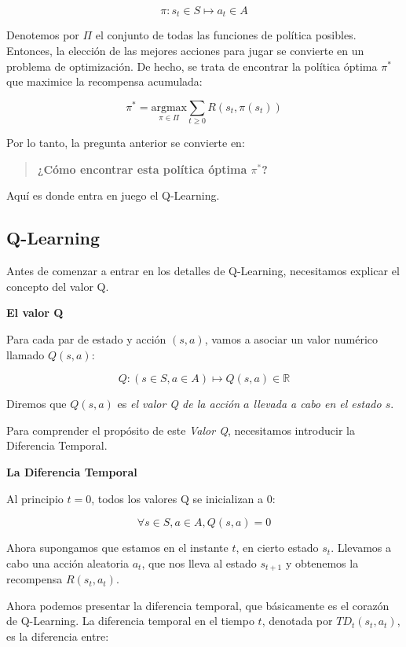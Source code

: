 \documentclass[
]{book}
\begin{document}
\[\pi: s_t \in S \mapsto a_t \in A\]

Denotemos por \(\Pi\) el conjunto de todas las funciones de política posibles. Entonces, la elección de las mejores acciones para jugar se convierte en un problema de optimización. De hecho, se trata de encontrar la política óptima \(\pi^*\) que maximice la recompensa acumulada:

\[\pi^* = \underset{\pi \in \Pi}{\textrm{argmax}} \sum_{t \ge 0} R(s_t,\pi(s_t))\]

Por lo tanto, la pregunta anterior se convierte en:

\begin{quote}
\textbf{¿Cómo encontrar esta política óptima \(\pi^*\)?}
\end{quote}

Aquí es donde entra en juego el Q-Learning.

\hypertarget{q-learning}{%
\subsection{Q-Learning}\label{q-learning}}

Antes de comenzar a entrar en los detalles de Q-Learning, necesitamos explicar el concepto del valor Q.

\textbf{El valor Q}

Para cada par de estado y acción \((s, a)\), vamos a asociar un valor numérico llamado \(Q (s, a)\):

\[Q: (s \in S, a \in A) \mapsto Q(s,a) \in \mathbb{R}\]

Diremos que \(Q (s, a)\) es \emph{el valor Q de la acción \(a\) llevada a cabo en el estado \(s\)}.

Para comprender el propósito de este \emph{Valor Q}, necesitamos introducir la Diferencia Temporal.

\textbf{La Diferencia Temporal}

Al principio \(t = 0\), todos los valores Q se inicializan a 0:

\[\forall s \in S, a \in A, Q(s,a) = 0\]

Ahora supongamos que estamos en el instante \(t\), en cierto estado \(s_t\). Llevamos a cabo una acción aleatoria \(a_t\), que nos lleva al estado \(s_{t + 1}\) y obtenemos la recompensa \(R(s_t, a_t)\).

Ahora podemos presentar la diferencia temporal, que básicamente es el corazón de Q-Learning. La diferencia temporal en el tiempo \(t\), denotada por \(TD_t(s_t, a_t)\), es la diferencia entre:
\end{document}
